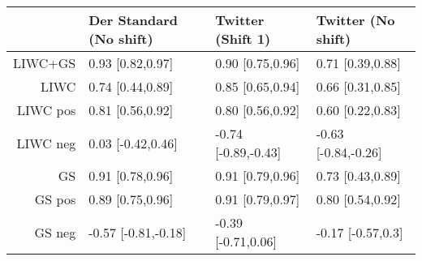 \documentclass[12pt,a4paper]{standalone}
\begin{document}

\begin{table}[hb!]
\centering
\begin{tabular}{rlll}
  \toprule
 & Der Standard (No shift) & Twitter (Shift 1) & Twitter (No shift) \\ 
  \midrule
LIWC+GS & 0.93 [0.82,0.97] & 0.90 [0.75,0.96] & 0.71 [0.39,0.88] \\ 
  LIWC & 0.74 [0.44,0.89] & 0.85 [0.65,0.94] & 0.66 [0.31,0.85] \\ 
  LIWC pos & 0.81 [0.56,0.92] & 0.80 [0.56,0.92] & 0.60 [0.22,0.83] \\ 
  LIWC neg & 0.03 [-0.42,0.46] & -0.74 [-0.89,-0.43] & -0.63 [-0.84,-0.26] \\ 
  GS & 0.91 [0.78,0.96] & 0.91 [0.79,0.96] & 0.73 [0.43,0.89] \\ 
  GS pos & 0.89 [0.75,0.96] & 0.91 [0.79,0.97] & 0.80 [0.54,0.92] \\ 
  GS neg & -0.57 [-0.81,-0.18] & -0.39 [-0.71,0.06] & -0.17 [-0.57,0.3] \\ 
   \bottomrule
\end{tabular}
\end{table}

\endminipage
\end{document}
